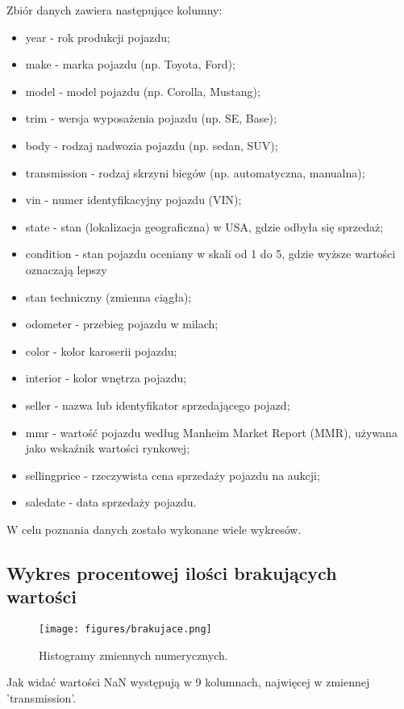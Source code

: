 \documentclass[10pt,letterpaper]{article}
\begin{document}
Zbiór danych zawiera następujące kolumny:
\begin{itemize}
\item year - rok produkcji pojazdu;
\item make - marka pojazdu (np. Toyota, Ford);
\item model - model pojazdu (np. Corolla, Mustang);
\item trim - wersja wyposażenia pojazdu (np. SE, Base);
\item body - rodzaj nadwozia pojazdu (np. sedan, SUV);
\item transmission - rodzaj skrzyni biegów (np. automatyczna, manualna);
\item vin - numer identyfikacyjny pojazdu (VIN);
\item state - stan (lokalizacja geograficzna) w USA, gdzie odbyła się sprzedaż;
\item condition - stan pojazdu oceniany w skali od 1 do 5, gdzie wyższe wartości oznaczają lepszy \item stan techniczny (zmienna ciągła);
\item odometer - przebieg pojazdu w milach;
\item color - kolor karoserii pojazdu;
\item interior - kolor wnętrza pojazdu;
\item seller - nazwa lub identyfikator sprzedającego pojazd;
\item mmr - wartość pojazdu według Manheim Market Report (MMR), używana jako wskaźnik wartości rynkowej;
\item sellingprice - rzeczywista cena sprzedaży pojazdu na aukcji;
\item saledate - data sprzedaży pojazdu.
\end{itemize}

W celu poznania danych zostało wykonane wiele wykresów.
\subsection{Wykres procentowej ilości brakujących wartości}
\begin{figure}[H]
\begin{center}
   \texttt{[image: figures/brakujace.png]}
\caption{Histogramy zmiennych numerycznych.}
   \label{fig:other-figure}
\end{center}
\end{figure}
Jak widać wartości NaN występują w 9 kolumnach, najwięcej w zmiennej 'transmission'.
\end{document}
